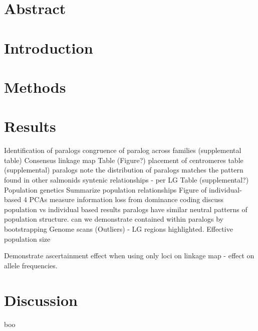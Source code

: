 \documentclass[12pt,  one column]{article}
\begin{document}
\section*{Abstract}

\section*{Introduction}

\section*{Methods}

\section*{Results}





Identification of paralogs
congruence of paralog across families (supplemental table)
Consensus linkage map
Table (Figure?)
placement of centromeres
table (supplemental)
paralogs
note the distribution of paralogs matches the  pattern found in other salmonids
syntenic relationships - per LG
Table (supplemental?)
Population genetics
Summarize population relationships
Figure of individual-based 4 PCAs
measure information loss from dominance coding
discuss population vs individual based results
paralogs have similar neutral patterns of population structure.
can we demonstrate contained within paralogs by bootstrapping 
Genome scans (Outliers) - LG regions highlighted.
Effective population size

Demonstrate ascertainment effect when using only loci on linkage map - effect on allele frequencies.


\section*{Discussion}

boo
\end{document}
